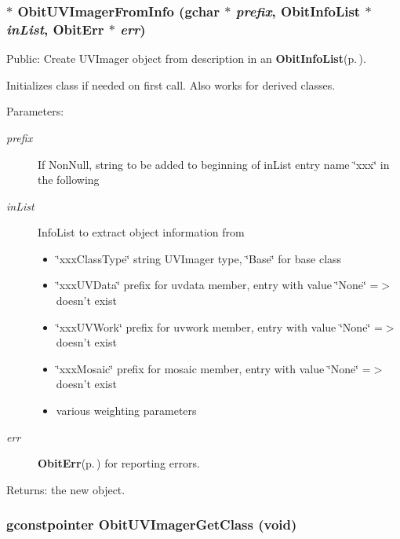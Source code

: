 \subsubsection{$\ast$ Obit\-UVImager\-From\-Info (gchar $\ast$ {\em prefix}, {\bf Obit\-Info\-List} $\ast$ {\em in\-List}, {\bf Obit\-Err} $\ast$ {\em err})}\label{ObitUVImager_8c_a7}


Public: Create UVImager object from description in an {\bf Obit\-Info\-List}{\rm (p.\,\pageref{structObitInfoList})}. 

Initializes class if needed on first call. Also works for derived classes. \begin{Desc}
\item[Parameters:]
\begin{description}
\item[{\em prefix}]If Non\-Null, string to be added to beginning of in\-List entry name \char`\"{}xxx\char`\"{} in the following \item[{\em in\-List}]Info\-List to extract object information from \begin{itemize}
\item \char`\"{}xxx\-Class\-Type\char`\"{} string UVImager type, \char`\"{}Base\char`\"{} for base class \item \char`\"{}xxx\-UVData\char`\"{} prefix for uvdata member, entry with value \char`\"{}None\char`\"{} =$>$ doesn't exist \item \char`\"{}xxx\-UVWork\char`\"{} prefix for uvwork member, entry with value \char`\"{}None\char`\"{} =$>$ doesn't exist \item \char`\"{}xxx\-Mosaic\char`\"{} prefix for mosaic member, entry with value \char`\"{}None\char`\"{} =$>$ doesn't exist \item various weighting parameters \end{itemize}
\item[{\em err}]{\bf Obit\-Err}{\rm (p.\,\pageref{structObitErr})} for reporting errors. \end{description}
\end{Desc}
\begin{Desc}
\item[Returns:]the new object. \end{Desc}
\subsubsection{\setlength{\rightskip}{0pt plus 5cm}gconstpointer Obit\-UVImager\-Get\-Class (void)}\label{ObitUVImager_8c_a8}


